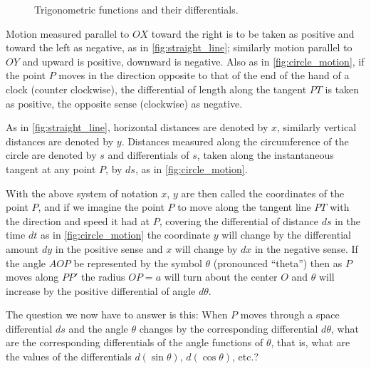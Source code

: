\begin{figure}[h]
    \caption{Trigonometric functions and their differentials.}
    \label{fig:trig_functions}
    \endgroup
\end{figure}

Motion measured parallel to $OX$ toward the right is to be taken as positive and toward the left as negative, as in \autoref{fig:straight_line}; similarly motion parallel to $OY$ and upward is positive, downward is negative. Also as in \autoref{fig:circle_motion}, if the point $P$ moves in the direction opposite to that of the end of the hand of a clock (counter clockwise), the differential of length along the tangent $PT$ is taken as positive, the opposite sense (clockwise) as negative.

As in \autoref{fig:straight_line}, horizontal distances are denoted by $x$, similarly vertical distances are denoted by $y$. Distances measured along the circumference of the circle are denoted by $s$ and differentials of $s$, taken along the instantaneous tangent at any point $P$, by $ds$, as in \autoref{fig:circle_motion}.

With the above system of notation $x$, $y$ are then called the coordinates of the point $P$, and if we imagine the point $P$ to move along the tangent line $PT$ with the direction and speed it had at $P$, covering the differential of distance $ds$ in the time $dt$ as in \autoref{fig:circle_motion} the coordinate $y$ will change by the differential amount $dy$ in the positive sense and $x$ will change by $dx$ in the negative sense. If the angle $AOP$ be represented by the symbol $\theta$ (pronounced ``theta'') then as $P$ moves along $PP'$ the radius $OP=a$ will turn about the center $O$ and $\theta$ will increase by the positive differential of angle $d\theta$.

The question we now have to answer is this: When $P$ moves through a space differential $ds$ and the angle $\theta$ changes by the corresponding differential $d\theta$, what are the corresponding differentials of the angle functions of $\theta$, that is, what are the values of the differentials $d(\sin \theta)$, $d(\cos\theta)$, etc.?

